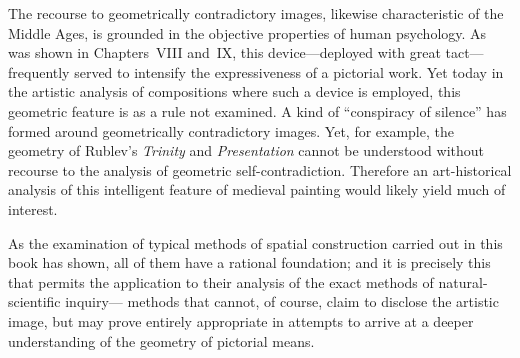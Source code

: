 The recourse to geometrically contradictory images, likewise characteristic of the Middle
Ages, is grounded in the objective properties of human psychology.  As was shown in
Chapters~VIII and~IX, this device---deployed with great tact---frequently served to
intensify the expressiveness of a pictorial work.  Yet today in the artistic analysis of
compositions where such a device is employed, this geometric feature is as a rule not
examined.  A kind of ``conspiracy of silence'' has formed around geometrically
contradictory images.  Yet, for example, the geometry of Rublev's
\emph{Trinity} and \emph{Presentation} cannot be understood without recourse to the
analysis of geometric self-contradiction.  Therefore an art-historical analysis of this
intelligent feature of medieval painting would likely yield much of interest.

As the examination of typical methods of spatial construction carried out in this book
has shown, all of them have a rational foundation; and it is precisely this that permits
the application to their analysis of the exact methods of natural-scientific inquiry---
methods that cannot, of course, claim to disclose the artistic image, but may prove
entirely appropriate in attempts to arrive at a deeper understanding of the geometry of
pictorial means.

